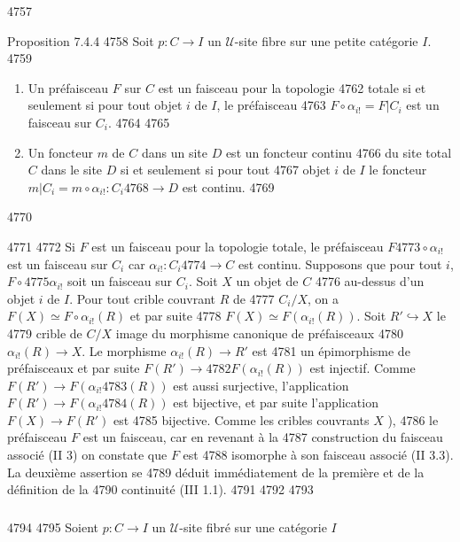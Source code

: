   4757	\begin{enonce*}{Proposition 7.4.4}
  4758	Soit $p : C \to I$ un $𝒰$-site fibre sur une petite catégorie $I$.
  4759	\begin{enumerate}
  4760	\renewcommand{\labelenumi}{\theenumi)}
  4761	\item Un préfaisceau $F$ sur $C$ est un faisceau pour la topologie
  4762	  totale si et seulement si pour tout objet $i$ de $I$, le préfaisceau
  4763	  $F \circ \alpha_{i!} = F | C_i$ est un faisceau sur $C_i$.
  4764	
  4765	\item Un foncteur $m$ de $C$ dans un site $D$ est un foncteur continu
  4766	  du site total $C$ dans le site $D$ si et seulement si pour tout
  4767	  objet $i$ de $I$ le foncteur $m | C_i = m \circ \alpha_{i!} : C_i
  4768	  \to D$ est continu.
  4769	\end{enumerate}
  4770	\end{enonce*}
  4771	
  4772	Si $F$ est un faisceau pour la topologie totale, le préfaisceau $F
  4773	\circ \alpha_{i!}$ est un faisceau sur $C_i$ car $\alpha_{i!} : C_i
  4774	\to C$ est continu. Supposons que pour tout $i$, $F \circ
  4775	\alpha_{i!}$ soit un faisceau sur $C_i$. Soit $X$ un objet de $C$
  4776	au-dessus d'un objet $i$ de $I$. Pour tout crible couvrant $R$ de
  4777	$C_i /X$, on a $F(X) \simeq F \circ \alpha_{i!} (R)$ et par suite
  4778	$F(X) \simeq F(\alpha_{i!} (R))$. Soit $R' \hookrightarrow X$ le
  4779	crible de $C/X$ image du morphisme canonique de préfaisceaux
  4780	$\alpha_{i!} (R) \to X$. Le morphisme $\alpha_{i!} (R) \to R'$ est
  4781	un épimorphisme de préfaisceaux et par suite $F(R') \to
  4782	F(\alpha_{i!} (R))$ est injectif. Comme $F(R') \to F(\alpha_{i!}
  4783	(R))$ est aussi surjective, l'application $F(R') \to F(\alpha_{i!}
  4784	(R))$ est bijective, et par suite l'application $F(X) \to F(R')$ est
  4785	bijective. Comme les cribles couvrants $X$ ),
  4786	le préfaisceau $F$ est un faisceau, car en revenant à la
  4787	construction du faisceau associé (II 3) on constate que $F$ est
  4788	isomorphe à son faisceau associé (II 3.3). La deuxième assertion se
  4789	déduit immédiatement de la première et de la définition de la
  4790	continuité (III 1.1).
  4791	
  4792	\setcounter{subsubsection}{4}
  4793	\subsubsection{}
  4794	
  4795	Soient $p : C \to I$ un $𝒰$-site fibré sur une catégorie $I$
